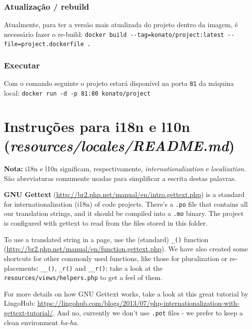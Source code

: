 \documentclass[12pt,a4paper,twoside,hyphens,english,brazil]{abntex2}
\begin{document}
{\subsubsection{Atualização / rebuild}
Atualmente, para ter a versão mais atualizada do projeto dentro da imagem, é necessário fazer o re-build: \texttt{docker build -{}-tag=konato/project:latest -{}-file=project.dockerfile .}
    
\subsubsection{Executar}
Com o comando seguinte o projeto estará disponível na porta \texttt{81} da máquina local: \texttt{docker run -d -p 81:80 konato/project}


\section{Instruções para i18n e l10n (\emph{resources/locales/README.md})}

\begin{framed}
	\noindent
	\textbf{Nota:} i18n e l10n significam, respectivamente, \emph{internationalization} e \emph{localization}. São abreviaturas comumente usadas para simplificar a escrita destas palavras.
\end{framed}

\begin{otherlanguage}{english}

\textbf{GNU Gettext} (\url{http://br2.php.net/manual/en/intro.gettext.php}) is a standard for internationalization (i18n) of code projects. There's a \texttt{.po} file that contains all our translation strings, and it should be compiled into a \texttt{.mo} binary. The project is configured with gettext to read from the files stored in this folder.

To use a translated string in a page, use the (standard) \texttt{\_()} function (\url{http://br2.php.net/manual/en/function.gettext.php}). We have also created some shortcuts for other commonly used functions, like those for pluralization or replacements: \texttt{\_\_()}, \texttt{\_r()} and \texttt{\_\_r()}; take a look at the \texttt{resources/views/helpers.php} to get a feel of them.

For more details on how GNU Gettext works, take a look at this great tutorial by LingoHub: \url{https://lingohub.com/blogs/2013/07/php-internationalization-with-gettext-tutorial/}. And no, currently we don't use \texttt{.pot} files - we prefer to keep a clean environment \emph{ha-ha}. 


\end{otherlanguage}}
\end{document}

